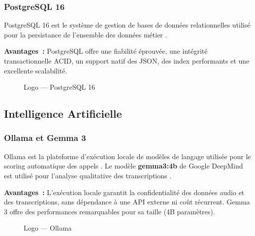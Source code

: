 \subsubsection{PostgreSQL 16}

\noindent PostgreSQL 16 est le système de gestion de bases de données relationnelles
utilisé pour la persistance de l'ensemble des données métier \cite{PostgreSQL}.

\textbf{Avantages~:} PostgreSQL offre une fiabilité éprouvée, une intégrité transactionnelle
ACID, un support natif des JSON, des index performants et une excellente scalabilité.

\begin{figure}[H]
    \centering
    \caption{Logo --- PostgreSQL 16}
    \label{fig:logo_postgresql}
\end{figure}

\subsection{Intelligence Artificielle}

\subsubsection{Ollama et Gemma 3}

\noindent Ollama est la plateforme d'exécution locale de modèles de langage utilisée
pour le scoring automatique des appels \cite{Ollama}. Le modèle \textbf{gemma3:4b} de
Google DeepMind est utilisé pour l'analyse qualitative des transcriptions \cite{Gemma3}.

\textbf{Avantages~:} L'exécution locale garantit la confidentialité des données audio
et des transcriptions, sans dépendance à une API externe ni coût récurrent. Gemma 3
offre des performances remarquables pour sa taille (4B paramètres).

\begin{figure}[H]
    \centering
    \caption{Logo --- Ollama}
    \label{fig:logo_ollama}
\end{figure}

